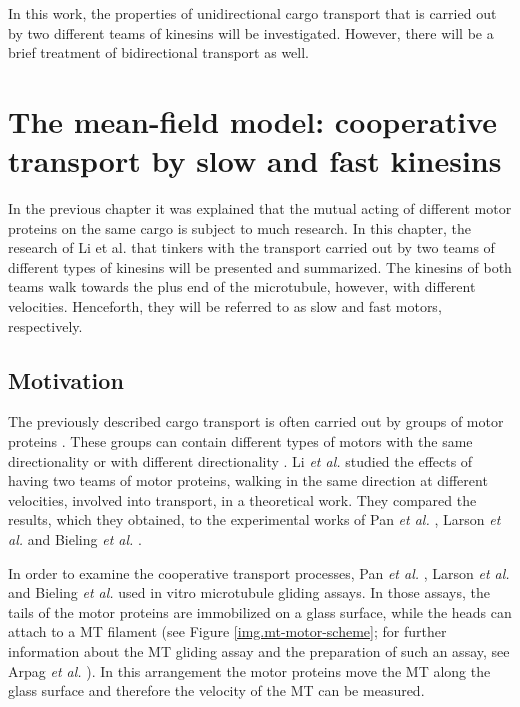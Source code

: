 In this work, the properties of unidirectional cargo transport that is carried out by two different teams of kinesins will be investigated. However, there will be a brief treatment of
bidirectional transport as well.



\chapter{The mean-field model: cooperative transport by slow and fast kinesins}\label{c.coop-transp-kinesin}
In the previous chapter it was explained that the mutual acting of different motor proteins on the same cargo is subject to much research. In this chapter, the research of Li et al. \cite{li}
that tinkers with the transport carried out by two teams of different types of kinesins will be presented and summarized. The kinesins of both teams walk towards the plus end of the microtubule,
however, with different velocities. Henceforth, they will be referred to as slow and fast motors, respectively.


\section{Motivation}\label{s.motivation}
The previously described cargo transport is often carried out by groups of motor proteins \cite{pnas102, physica42}. These groups can contain different types of motors with the same directionality \cite{ncb6} or
with different directionality \cite{cb14, pnas94, mbc17}. Li \textit{et al.} \cite{li} studied the effects of having two teams of motor proteins, walking in the same direction at different
velocities, involved into transport, in a theoretical work. They compared the results, which they obtained, to the experimental works of Pan \textit{et al.} \cite{jcb174}, Larson \cite{larson}
\textit{et al.} and Bieling \textit{et al.} \cite{bieling}.

In order to examine the cooperative transport processes, Pan \textit{et al.} \cite{jcb174}, Larson \textit{et al.} \cite{larson} and Bieling \textit{et al.} \cite{bieling} used in vitro microtubule
gliding assays. In those assays, the tails of the motor proteins are immobilized on a glass surface, while the heads can attach to a MT filament (see Figure \ref{img.mt-motor-scheme}; for further
information about the MT gliding assay and the preparation of such an assay, see Arpag \textit{et al.} \cite{arpag}). In this arrangement the motor proteins move the MT along the glass surface and
therefore the velocity of the MT can be measured.

